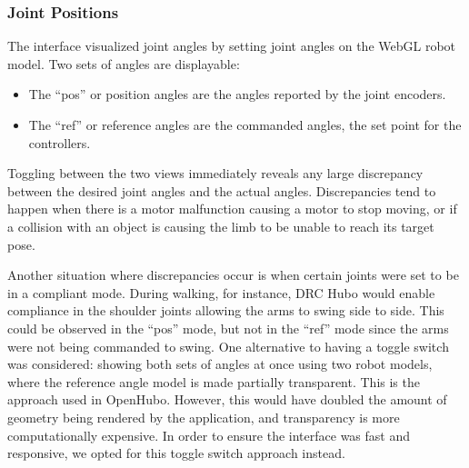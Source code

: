 \documentclass[letterpaper, 10 pt, conference]{ieee/ieeeconf}  %
\begin{document}
\subsubsection{Joint Positions}
The interface visualized joint angles by setting joint angles on the WebGL robot model.
Two sets of angles are displayable:
\begin{itemize}
\item The ``pos'' or position angles are the angles reported by the joint encoders.
\item The ``ref'' or reference angles are the commanded angles, the set point for the controllers. 
\end{itemize}
Toggling between the two views immediately reveals any large discrepancy between the desired joint angles and the actual angles.
Discrepancies tend to happen when there is a motor malfunction causing a motor to stop moving, or if a collision with an object is causing the limb to be unable to reach its target pose.

Another situation where discrepancies occur is when certain joints were set to be in a compliant mode.
During walking, for instance, DRC Hubo would enable compliance in the shoulder joints allowing the arms to swing side to side.
This could be observed in the ``pos'' mode, but not in the ``ref'' mode since the arms were not being commanded to swing.
One alternative to having a toggle switch was considered: showing both sets of angles at once using two robot models, where the reference angle model is made partially transparent.
This is the approach used in OpenHubo. 
However, this would have doubled the amount of geometry being rendered by the application, and transparency is more computationally expensive.
In order to ensure the interface was fast and responsive, we opted for this toggle switch approach instead.

\end{document}
